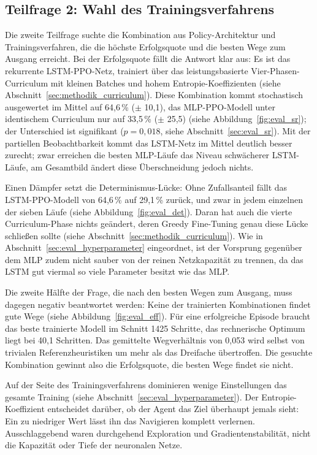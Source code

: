 \documentclass[
  a4paper,
  11pt,
  twoside,
  BCOR=8mm,           %
  headings=big,
  numbers=noenddot,
  listof=totoc,       %
  captions=tableheading,
]{scrreprt}
\begin{document}
\subsection*{Teilfrage 2: Wahl des Trainingsverfahrens}
Die zweite Teilfrage suchte die Kombination aus Policy-Architektur und Trainingsverfahren, die die höchste Erfolgsquote und die besten Wege zum Ausgang erreicht. Bei der Erfolgsquote fällt die Antwort klar aus: Es ist das rekurrente LSTM-PPO-Netz, trainiert über das leistungsbasierte Vier-Phasen-Curriculum mit kleinen Batches und hohem Entropie-Koeffizienten (siehe Abschnitt~\ref{sec:methodik_curriculum}). Diese Kombination kommt stochastisch ausgewertet im Mittel auf 64,6\,\% ($\pm$ 10,1), das MLP-PPO-Modell unter identischem Curriculum nur auf 33,5\,\% ($\pm$ 25,5) (siehe Abbildung~\ref{fig:eval_sr}); der Unterschied ist signifikant ($p = 0{,}018$, siehe Abschnitt~\ref{sec:eval_sr}). Mit der partiellen Beobachtbarkeit kommt das LSTM-Netz im Mittel deutlich besser zurecht; zwar erreichen die besten MLP-Läufe das Niveau schwächerer LSTM-Läufe, am Gesamtbild ändert diese Überschneidung jedoch nichts.

Einen Dämpfer setzt die Determinismus-Lücke: Ohne Zufallsanteil fällt das LSTM-PPO-Modell von 64,6\,\% auf 29,1\,\% zurück, und zwar in jedem einzelnen der sieben Läufe (siehe Abbildung~\ref{fig:eval_det}). Daran hat auch die vierte Curriculum-Phase nichts geändert, deren Greedy Fine-Tuning genau diese Lücke schließen sollte (siehe Abschnitt~\ref{sec:methodik_curriculum}). Wie in Abschnitt~\ref{sec:eval_hyperparameter} eingeordnet, ist der Vorsprung gegenüber dem MLP zudem nicht sauber von der reinen Netzkapazität zu trennen, da das LSTM gut viermal so viele Parameter besitzt wie das MLP.

Die zweite Hälfte der Frage, die nach den besten Wegen zum Ausgang, muss dagegen negativ beantwortet werden: Keine der trainierten Kombinationen findet gute Wege (siehe Abbildung~\ref{fig:eval_eff}). Für eine erfolgreiche Episode braucht das beste trainierte Modell im Schnitt 1425 Schritte, das rechnerische Optimum liegt bei 40,1 Schritten. Das gemittelte Wegverhältnis von 0,053 wird selbst von trivialen Referenzheuristiken um mehr als das Dreifache übertroffen. Die gesuchte Kombination gewinnt also die Erfolgsquote, die besten Wege findet sie nicht.

Auf der Seite des Trainingsverfahrens dominieren wenige Einstellungen das gesamte Training (siehe Abschnitt~\ref{sec:eval_hyperparameter}). Der Entropie-Koeffizient entscheidet darüber, ob der Agent das Ziel überhaupt jemals sieht: Ein zu niedriger Wert lässt ihn das Navigieren komplett verlernen. Ausschlaggebend waren durchgehend Exploration und Gradientenstabilität, nicht die Kapazität oder Tiefe der neuronalen Netze.
\end{document}
